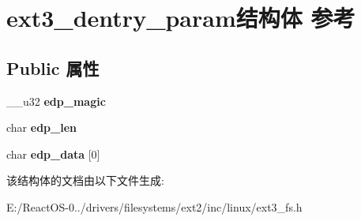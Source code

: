 \hypertarget{structext3__dentry__param}{}\section{ext3\+\_\+dentry\+\_\+param结构体 参考}
\label{structext3__dentry__param}
\subsection*{Public 属性}
\begin{DoxyCompactItemize}
\item 
\mbox{\label{structext3__dentry__param_a259b8ccf3b7898481489a53049445aba}} 
\+\_\+\+\_\+u32 {\bfseries edp\+\_\+magic}
\item 
\mbox{\label{structext3__dentry__param_a41dae44a329f1959a165ebb4dc448a52}} 
char {\bfseries edp\+\_\+len}
\item 
\mbox{\label{structext3__dentry__param_aa84f6a038040465823318e45b98e902a}} 
char {\bfseries edp\+\_\+data} \mbox{[}0\mbox{]}
\end{DoxyCompactItemize}


该结构体的文档由以下文件生成\+:\begin{DoxyCompactItemize}
\item 
E\+:/\+React\+O\+S-\/0../drivers/filesystems/ext2/inc/linux/ext3\+\_\+fs.\+h\end{DoxyCompactItemize}
